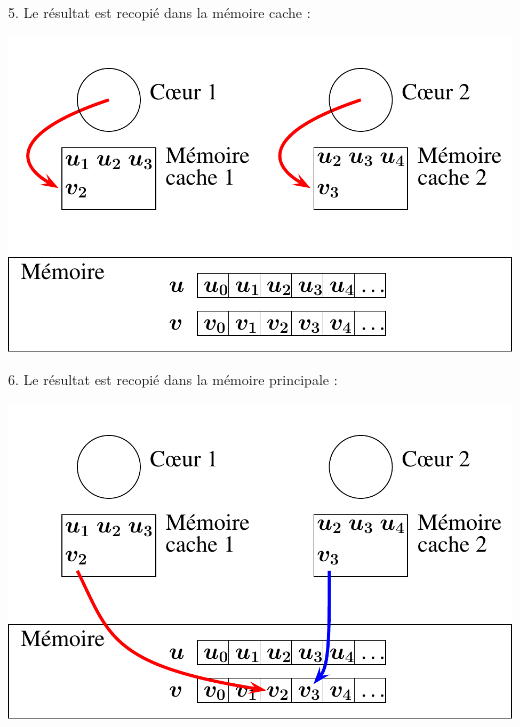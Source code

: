 \documentclass{beamer}
\begin{document}
\begin{frame}
	\parbox[t][1cm]{10cm}{5. Le résultat est recopié dans la mémoire cache :}
	\begin{center}
		\includegraphics[scale=0.6]{../../Images/multithread4}
	\end{center}
\end{frame}

\begin{frame}
	\parbox[t][1cm]{10cm}{6. Le résultat est recopié dans la mémoire principale :}
	\begin{center}
		\includegraphics[scale=0.6]{../../Images/multithread5}
	\end{center}
\end{frame}
\end{document}
